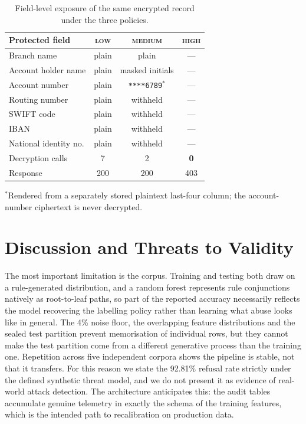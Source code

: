 \documentclass[a4paper,conference]{IEEEtran}
\newcommand{\HIGH}{\textsc{high}}
\newcommand{\MED}{\textsc{medium}}
\newcommand{\LOW}{\textsc{low}}
\begin{document}
\begin{table}[t]
\caption{Field-level exposure of the same encrypted record under the three policies.}
\label{tab:exposure}
\centering
\footnotesize
\begin{tabular}{@{}lccc@{}}
\toprule
Protected field & \LOW{} & \MED{} & \HIGH{} \\
\midrule
Branch name          & plain & plain & --- \\
Account holder name  & plain & masked initials & --- \\
Account number       & plain & \texttt{****6789}$^{*}$ & --- \\
Routing number       & plain & withheld & --- \\
SWIFT code           & plain & withheld & --- \\
IBAN                 & plain & withheld & --- \\
National identity no.& plain & withheld & --- \\
\midrule
Decryption calls     & 7 & 2 & \textbf{0} \\
Response             & 200 & 200 & 403 \\
\bottomrule
\end{tabular}

\smallskip
\parbox{\columnwidth}{\scriptsize $^{*}$Rendered from a separately stored plaintext last-four
column; the account-number ciphertext is never decrypted.}
\end{table}

\section{Discussion and Threats to Validity}

The most important limitation is the corpus. Training and testing both draw on a rule-generated
distribution, and a random forest represents rule conjunctions natively as root-to-leaf paths, so
part of the reported accuracy necessarily reflects the model recovering the labelling policy
rather than learning what abuse looks like in general. The 4\% noise floor, the overlapping
feature distributions and the sealed test partition prevent memorisation of individual rows, but
they cannot make the test partition come from a different generative process than the training
one. Repetition across five independent corpora shows the pipeline is stable, not that it
transfers. For this reason we state the 92.81\% refusal rate strictly under the defined synthetic
threat model, and we do not present it as evidence of real-world attack detection. The
architecture anticipates this: the audit tables accumulate genuine telemetry in exactly the
schema of the training features, which is the intended path to recalibration on production data.
\end{document}
